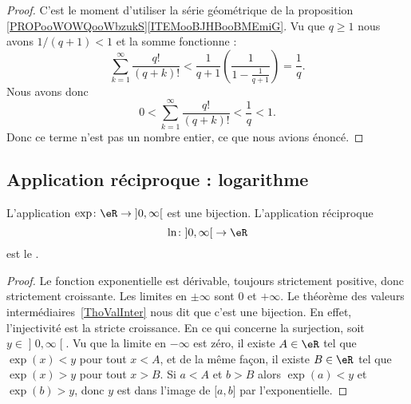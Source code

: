 \begin{proof}
	C'est le moment d'utiliser la série géométrique de la proposition \ref{PROPooWOWQooWbzukS}\ref{ITEMooBJHBooBMEmiG}. Vu que \( q\geq 1\) nous avons \( 1/(q+1)<1\) et la somme fonctionne :
	\begin{equation}
		\sum_{k=1}^{\infty}\frac{ q! }{ (q+k)! }<\frac{1}{ q+1 }\left( \frac{1}{ 1-\frac{1}{ q+1 } } \right)=\frac{1}{ q }.
	\end{equation}
	Nous avons donc
	\begin{equation}
		0< \sum_{k=1}^{\infty}\frac{ q! }{ (q+k)! }<\frac{1}{ q }<1.
	\end{equation}
	Donc ce terme n'est pas un nombre entier, ce que nous avions énoncé.
\end{proof}

\subsection{Application réciproque : logarithme}

\begin{propositionDef}    \label{DEFooELGOooGiZQjt}
	L'application \(\exp\colon \eR\to \mathopen] 0 , \infty \mathclose[\) est une bijection. L'application réciproque
	\begin{equation}
		\ln\colon \mathopen] 0 , \infty \mathclose[\to \eR
	\end{equation}
	est le .
\end{propositionDef}

\begin{proof}
	Le fonction exponentielle est dérivable, toujours strictement positive, donc strictement croissante. Les limites en \( \pm \infty\) sont \( 0\) et \( +\infty\). Le théorème des valeurs intermédiaires~\ref{ThoValInter} nous dit que c'est une bijection. En effet, l'injectivité est la stricte croissance. En ce qui concerne la surjection, soit \( y\in \mathopen] 0 , \infty \mathclose[\). Vu que la limite en \( -\infty\) est zéro, il existe \( A\in \eR\) tel que \( \exp(x)<y\) pour tout \( x<A\), et de la même façon, il existe \( B\in \eR\) tel que \( \exp(x)>y\) pour tout \( x>B\). Si \( a<A\) et \( b>B\) alors \( \exp(a)<y\) et \( \exp(b)>y\), donc \( y\) est dans l'image de \( \mathopen[ a , b \mathclose]\) par l'exponentielle.
\end{proof}

